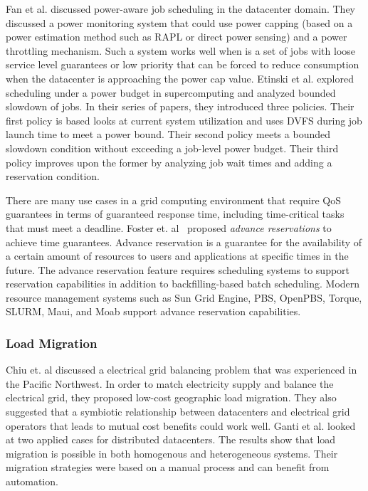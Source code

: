 Fan et al. \cite{PowerAwareServer1} discussed power-aware job scheduling in the
datacenter domain. They discussed a power monitoring system that could use
power capping (based on a power estimation method such as RAPL or direct power
sensing) and a power throttling mechanism. Such a system works well when is a
set of jobs with loose service level guarantees or low priority that can be
forced to reduce consumption when the datacenter is approaching the power cap
value. 
Etinski et al. \cite{Etinski1,Etinski2,Etinski3,Etinski4} explored
scheduling under a power budget in supercomputing and analyzed bounded slowdown
of jobs. In their series of papers, they introduced three policies. Their first
policy is based looks at current system utilization and uses DVFS during job
launch time to meet a power bound. Their second policy meets a bounded slowdown
condition without exceeding a job-level power budget. Their third policy
improves upon the former by analyzing job wait times and adding a reservation
condition. 

There are many use cases in a grid computing environment that require QoS
guarantees in terms of guaranteed response time, including time-critical tasks
that must meet a deadline. Foster et. al~\cite{foster_distributed_1999,foster_anatomy_2001} proposed \emph{advance
reservations} to achieve time guarantees. Advance reservation is a guarantee for
the availability of a certain amount of resources to users and applications at
specific times in the future. The advance reservation feature requires
scheduling systems to support reservation capabilities in addition to
backfilling-based batch scheduling. Modern resource management systems such as
Sun Grid Engine, PBS, OpenPBS, Torque, SLURM, Maui, and Moab support advance
reservation capabilities.

\subsubsection{Load Migration}
Chiu et. al \cite{chiu_electric_2012} discussed a electrical grid balancing
problem that was experienced in the Pacific Northwest. In order to match
electricity supply and balance the electrical grid, they proposed low-cost
geographic load migration. They also suggested that a symbiotic relationship
between datacenters and electrical grid operators that leads to mutual cost
benefits could work well. Ganti et al. \cite{Ghatikar2012b} looked at two
applied cases for distributed datacenters. The results show that load migration
is possible in both homogenous and heterogeneous systems. Their migration
strategies were based on a manual process and can benefit from automation.

